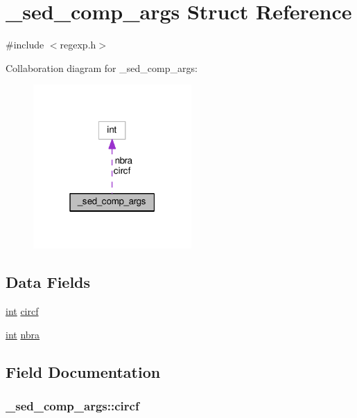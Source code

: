\hypertarget{struct__sed__comp__args}{}\section{\+\_\+sed\+\_\+comp\+\_\+args Struct Reference}
\label{struct__sed__comp__args}


{\ttfamily \#include $<$regexp.\+h$>$}



Collaboration diagram for \+\_\+sed\+\_\+comp\+\_\+args\+:
\nopagebreak
\begin{figure}[H]
\begin{center}
\leavevmode
\includegraphics[width=171pt]{struct__sed__comp__args__coll__graph}
\end{center}
\end{figure}
\subsection*{Data Fields}
\begin{DoxyCompactItemize}
\item 
\hyperlink{pcre_8txt_a42dfa4ff673c82d8efe7144098fbc198}{int} \hyperlink{struct__sed__comp__args_a91a72fe734b82eefcf75d95e5e7e9995}{circf}
\item 
\hyperlink{pcre_8txt_a42dfa4ff673c82d8efe7144098fbc198}{int} \hyperlink{struct__sed__comp__args_a028c74968591ad5103b26b42ff700e4c}{nbra}
\end{DoxyCompactItemize}


\subsection{Field Documentation}
\subsubsection[{\texorpdfstring{circf}{circf}}]{ \+\_\+sed\+\_\+comp\+\_\+args\+::circf}\hypertarget{struct__sed__comp__args_a91a72fe734b82eefcf75d95e5e7e9995}{}\label{struct__sed__comp__args_a91a72fe734b82eefcf75d95e5e7e9995}
